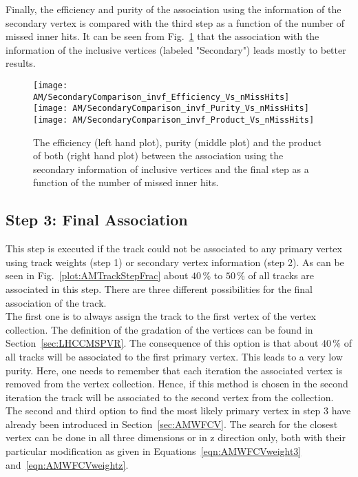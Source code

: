 Finally, the efficiency and purity of the association using the information of the secondary vertex is compared with the third step as a function of the number of missed inner hits. It can be seen from Fig.~\ref{plot:AMWFSVinvfEffAndPurVsFA} that the association with the information of the inclusive vertices (labeled "Secondary") leads mostly to better results.

\begin{figure}[!ht]
    \centering
    \texttt{[image: AM/SecondaryComparison\_invf\_Efficiency\_Vs\_nMissHits]}
    \texttt{[image: AM/SecondaryComparison\_invf\_Purity\_Vs\_nMissHits]}
    \texttt{[image: AM/SecondaryComparison\_invf\_Product\_Vs\_nMissHits]}
    \caption[Efficiency, purity and their product for the association with inclusive vertices vs final association as a function of missed inner hits]{The efficiency (left hand plot), purity (middle plot) and the product of both (right hand plot) between the association using the secondary information of inclusive vertices and the final step as a function of the number of missed inner hits.\label{plot:AMWFSVinvfEffAndPurVsFA}}
\end{figure}


\subsection{Step 3: Final Association\label{sec:AMWFFA}}

This step is executed if the track could not be associated to any primary vertex using track weights (step 1) or secondary vertex information (step 2). As can be seen in Fig.~\ref{plot:AMTrackStepFrac} about $40\,\%$ to $50\,\%$ of all tracks are associated in this step. There are three different possibilities for the final association of the track. \\
The first one is to always assign the track to the first vertex of the vertex collection. The definition of the gradation of the vertices can be found in Section~\ref{sec:LHCCMSPVR}. The consequence of this option is that about $40\,\%$ of all tracks will be associated to the first primary vertex. This leads to a very low purity. Here, one needs to remember that each iteration the associated vertex is removed from the vertex collection. Hence, if this method is chosen in the second iteration the track will be associated to the second vertex from the collection. \\
The second and third option to find the most likely primary vertex in step 3 have already been introduced in Section~\ref{sec:AMWFCV}. The search for the closest vertex can be done in all three dimensions or in z direction only, both with their particular modification as given in Equations~\ref{eqn:AMWFCVweight3} and~\ref{eqn:AMWFCVweightz}.

